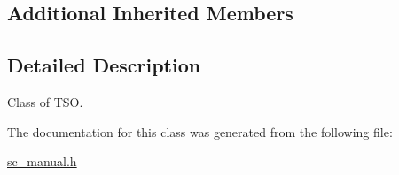 \subsection*{Additional Inherited Members}


\subsection{Detailed Description}
Class of T\+SO. 

The documentation for this class was generated from the following file\+:\begin{DoxyCompactItemize}
\item 
\mbox{\hyperlink{sc__manual_8h}{sc\+\_\+manual.\+h}}\end{DoxyCompactItemize}
